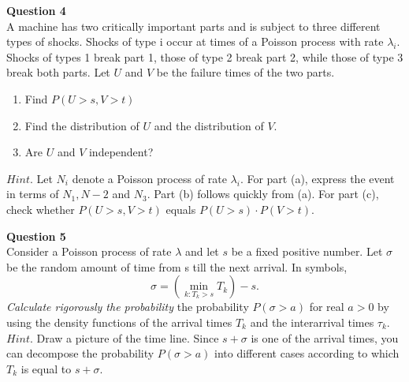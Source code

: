 \documentclass[12pt]{article}
\begin{document}
\vspace{1.5\baselineskip}
\textbf{Question 4}\\
A machine has two critically important parts and is subject to three different types of shocks. Shocks of type i occur at times of a Poisson process with rate $\lambda_i$. Shocks of types 1 break part 1, those of type 2 break part 2, while those of type 3 break both parts. Let $U$ and $V$ be the failure times of the two parts.
\begin{enumerate}[label=(\alph*)]
    \item Find $P(U>s,V>t)$
    \item Find the distribution of $U$ and the distribution of $V$.
    \item Are $U$ and $V$ independent?
\end{enumerate}
$Hint.$ Let $N_i$ denote a Poisson process of rate $\lambda_i$. For part (a), express the event in terms of $N_1, N-2$ and $N_3$. Part (b) follows quickly from (a). For part (c), check whether $P(U>s,V>t)$ equals $P(U>s)\cdot P(V>t)$.

\vspace{1.5\baselineskip}
\textbf{Question 5}\\
Consider a Poisson process of rate $\lambda$ and let $s$ be a fixed positive number. Let $\sigma$ be the
random amount of time from s till the next arrival. In symbols,
$$\sigma = \left(\min\limits_{k:T_k>s} T_k\right) - s.$$
{\sl Calculate rigorously the probability} the probability $P(\sigma>a)$ for real $a>0$ by using the density functions of the arrival times $T_k$ and the interarrival times $\tau_k$.\\
$Hint.$ Draw a picture of the time line. Since $s+\sigma$ is one of the arrival times, you can decompose the probability $P(\sigma>a)$ into different cases according to which $T_k$ is equal to $s+\sigma$.
\end{document}
